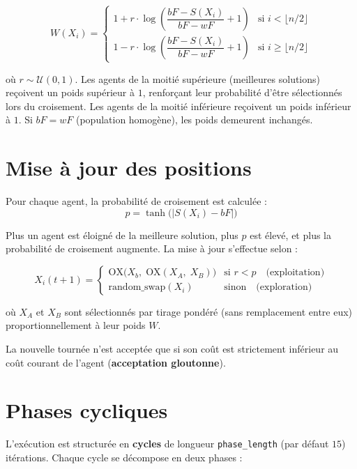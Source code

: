\documentclass[12pt,a4paper]{report}
\begin{document}
\begin{equation}
	W(X_i) =
	\begin{cases}
		1 + r \cdot \log\!\left(\dfrac{bF - S(X_i)}{bF - wF} + 1\right)
		& \text{si } i < \lfloor n/2 \rfloor \\[6pt]
		1 - r \cdot \log\!\left(\dfrac{bF - S(X_i)}{bF - wF} + 1\right)
		& \text{si } i \geq \lfloor n/2 \rfloor
	\end{cases}
\end{equation}

où $r \sim \mathcal{U}(0, 1)$. Les agents de la moitié supérieure
(meilleures solutions) reçoivent un poids supérieur à $1$, renforçant
leur probabilité d'être sélectionnés lors du croisement. Les agents de
la moitié inférieure reçoivent un poids inférieur à $1$. Si $bF = wF$
(population homogène), les poids demeurent inchangés.

\section{Mise à jour des positions}
Pour chaque agent, la probabilité de croisement est calculée :
\begin{equation}
	p = \tanh\!\bigl(|S(X_i) - bF|\bigr)
\end{equation}

Plus un agent est éloigné de la meilleure solution, plus $p$ est élevé,
et plus la probabilité de croisement augmente. La mise à jour s'effectue
selon :

\begin{equation}
	X_i(t+1) =
	\begin{cases}
		\text{OX}\bigl(X_b,\; \text{OX}(X_A,\; X_B)\bigr)
		& \text{si } r < p \quad \text{(exploitation)} \\[4pt]
		\text{random\_swap}(X_i)
		& \text{sinon} \quad \text{(exploration)}
	\end{cases}
\end{equation}

où $X_A$ et $X_B$ sont sélectionnés par tirage pondéré (sans remplacement
entre eux) proportionnellement à leur poids $W$.

La nouvelle tournée n'est acceptée que si son coût est strictement
inférieur au coût courant de l'agent (\textbf{acceptation gloutonne}).

\section{Phases cycliques}
L'exécution est structurée en \textbf{cycles} de longueur
\texttt{phase\_length} (par défaut $15$) itérations. Chaque cycle se
décompose en deux phases :
\end{document}
